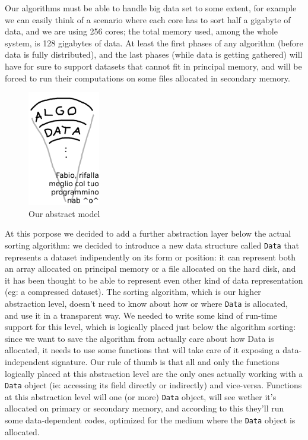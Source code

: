 Our algorithms must be able to handle big data set to some extent, for example we can easily think of a scenario where each core has to sort half a gigabyte of data, and we are using 256 cores; the total memory used, among the whole system, is 128 gigabytes of data.
At least the first phases of any algorithm (before data is fully distributed), and the last phases (while data is getting gathered) will have for sure to support datasets that cannot fit in principal memory, and will be forced to run their computations on some files allocated in secondary memory.

\begin{figure}
  \begin{center}
    \includegraphics[width=0.28\textwidth]{datalayer.png}
  \end{center}
  \caption{Our abstract model}
\end{figure}

At this porpose we decided to add a further abstraction layer below the actual sorting algorithm: we decided to introduce a new data structure called \texttt{Data} that represents a dataset indipendently on its form or position: it can represent both an array allocated on principal memory or a file allocated on the hard disk, and it has been thought to be able to represent even other kind of data representation (eg: a compressed dataset). The sorting algorithm, which is our higher abstraction level, doesn't need to know about how or where \texttt{Data} is allocated, and use it in a transparent way.
We needed to write some kind of run-time support for this level, which is logically placed just below the algorithm sorting: since we want to save the algorithm from actually care about how Data is allocated, it needs to use some functions that will take care of it exposing a data-independent signature. Our rule of thumb is that all and only the functions logically placed at this abstraction level are the only ones actually working with a \texttt{Data} object (ie: accessing its field directly or indirectly) and vice-versa.
Functions at this abstraction level will one (or more) \texttt{Data} object, will see wether it's allocated on primary or secondary memory, and according to this they'll run some data-dependent codes, optimized for the medium where the \texttt{Data} object is allocated.

